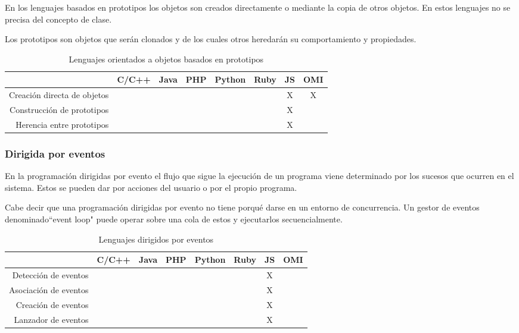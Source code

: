 En los lenguajes basados en prototipos los objetos son creados directamente o mediante
la copia de otros objetos. En estos lenguajes no se precisa del concepto de clase.

Los prototipos son objetos que serán clonados y de los cuales otros heredarán su
comportamiento y propiedades.

\FloatBarrier
\begin{table}[h]
\begin{center}
 
\begin{tabular}{|r|c|c|c|c|c|c|c|} \hline
 & C/C++ & Java &  PHP  & Python & Ruby & JS & OMI\\ \hline
Creación directa de objetos &  & &  &  &  & X & X \\ \hline
Construcción de prototipos &  & &  &  &  & X &  \\ \hline
Herencia entre prototipos &  & &  &  &  & X &  \\ \hline
\end{tabular}
\caption{Lenguajes orientados a objetos basados en prototipos}
\end{center}
\end{table}
\FloatBarrier

\subsubsection{Dirigida por eventos}
En la programación dirigidas por evento el flujo que sigue la ejecución de un programa viene 
determinado por los sucesos que ocurren en el sistema. Estos se pueden dar por acciones del usuario
o por el propio programa.

Cabe decir que una programación dirigidas por evento no tiene porqué darse en un 
entorno de concurrencia. Un gestor de eventos denominado``event loop" puede operar sobre 
una cola de estos y ejecutarlos secuencialmente.

\FloatBarrier
\begin{table}[h]
\begin{center}
 
\begin{tabular}{|r|c|c|c|c|c|c|c|} \hline
 & C/C++ & Java & PHP  & Python & Ruby & JS & OMI\\ \hline
Detección de eventos & & & & & & X &  \\ \hline
Asociación de eventos & & & & & & X &  \\ \hline  
Creación de eventos & & & & & & X &  \\ \hline  
Lanzador de eventos & & & & & & X &  \\ \hline  
\end{tabular}
\caption{Lenguajes dirigidos por eventos}
\end{center}
\end{table}
\FloatBarrier

